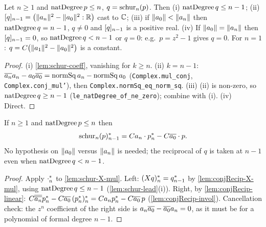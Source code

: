 \begin{lemma}\label{lem:schur-lead}
Let $n\ge1$ and $\natdeg\,p\le n$, $q=\Sch_n(p)$. Then (i)
$\natdeg\,q\le n-1$; (ii) $\coeff q{n-1}=\big(\nm{a_n}^2-\nm{a_0}^2:\R\big)$
cast to $\C$; (iii) if $\nm{a_0}<\nm{a_n}$ then $\natdeg\,q=n-1$, $q\ne0$ and
$\coeff q{n-1}$ is a positive real. (iv) If $\nm{a_0}=\nm{a_n}$ then
$\coeff q{n-1}=0$, so $\natdeg\,q<n-1$ or $q=0$: e.g.\ $p=z^2-1$ gives $q=0$.
For $n=1$: $q=C\big(\nm{a_1}^2-\nm{a_0}^2\big)$ is a constant.
\end{lemma}
\begin{proof}
(i) \ref{lem:schur-coeff}, vanishing for $k\ge n$. (ii) $k=n-1$:
$\cj{a_n}a_n-a_0\cj{a_0}=\mathrm{normSq}\,a_n-\mathrm{normSq}\,a_0$
(\texttt{Complex.mul\_conj}, \texttt{Complex.conj\_mul'}),
then \texttt{Complex.normSq\_eq\_norm\_sq}. (iii) (ii) is non-zero, so
$\natdeg\,q\ge n-1$ (\texttt{le\_natDegree\_of\_ne\_zero}); combine with (i).
(iv) Direct.
\end{proof}

\begin{lemma}\label{lem:qstar-identity}
If $n\ge1$ and $\natdeg\,p\le n$ then
\[ \crec{n-1}{\Sch_n(p)}=C a_n\cdot\crec np-C\cj{a_0}\cdot p . \]
No hypothesis on $\nm{a_0}$ versus $\nm{a_n}$ is needed; the reciprocal of $q$ is
taken at $n-1$ even when $\natdeg\,q<n-1$.
\end{lemma}
\begin{proof}
Apply $\crec n{\cdot}$ to \ref{lem:schur-X-mul}. Left:
$\crec n{(Xq)}=\crec{n-1}q$ by \ref{lem:conjRecip-X-mul}, using
$\natdeg\,q\le n-1$ (\ref{lem:schur-lead}(i)). Right, by
\ref{lem:conjRecip-linear}:
$C\cj{\cj{a_n}}\crec np-C\cj{a_0}\,\crec n{(\crec np)}
=C a_n\crec np-C\cj{a_0}\,p$ (\ref{lem:conjRecip-invol}). Cancellation check:
the $z^n$ coefficient of the right side is $a_n\cj{a_0}-\cj{a_0}a_n=0$, as it
must be for a polynomial of formal degree $n-1$.
\end{proof}

